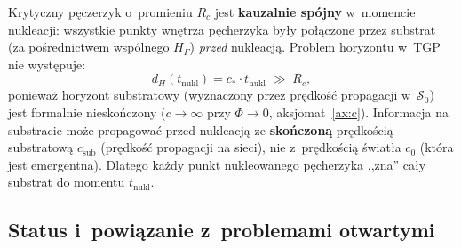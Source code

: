 \begin{proposition}\label{prop:horizon-coherence}
Krytyczny p\k{e}czerzyk o~promieniu $R_c$ jest \textbf{kauzalnie
sp\'ojny} w~momencie nukleacji: wszystkie punkty wn\k{e}trza
p\k{e}cherzyka by\l{}y po\l{}\k{a}czone przez substrat
(za po\'srednictwem wsp\'olnego $H_\Gamma$) \emph{przed}
nukleacj\k{a}. Problem horyzontu w~TGP nie wyst\k{e}puje:
\begin{equation}\label{eq:causal-coherence}
    d_H(t_\mathrm{nukl}) = c_* \cdot t_\mathrm{nukl}
    \;\gg\; R_c,
\end{equation}
poniewa\.z horyzont substratowy (wyznaczony przez pr\k{e}dko\'s\'c
propagacji w~$\mathcal{S}_0$) jest formalnie nieskończony
($c \to \infty$ przy $\Phi \to 0$, aksjomat~\ref{ax:c}).
Informacja na substracie mo\.ze propagowa\'c przed nukleacj\k{a}
ze \textbf{skończon\k{a}} pr\k{e}dko\'sci\k{a} substratow\k{a}
$c_\mathrm{sub}$ (pr\k{e}dko\'s\'c propagacji na sieci),
nie z~pr\k{e}dko\'sci\k{a} \'swiat\l{}a $c_0$ (która jest
emergentna). Dlatego ka\.zdy punkt nukleowanego p\k{e}cherzyka
,,zna'' ca\l{}y substrat do momentu $t_\mathrm{nukl}$.
\end{proposition}

\subsection{Status i~powi\k{a}zanie z~problemami otwartymi}%
\label{app:G-status}

